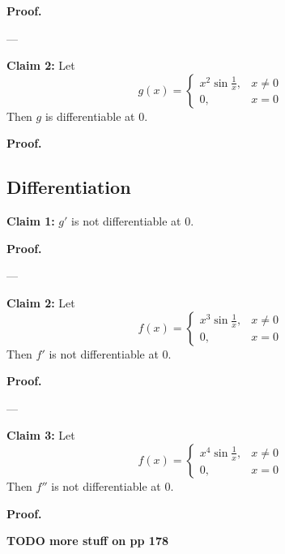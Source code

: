\vs

\textbf{Proof.}

\vs---\vs

\textbf{Claim 2:} Let
\[g(x)=\begin{cases}
  x^2\sin \frac{1}{x},&x\neq0\\
  0,&x=0
\end{cases}\]
Then $g$ is differentiable at $0$.

\vs

\textbf{Proof.}

\subsection{Differentiation}

\textbf{Claim 1:} $g'$ is not differentiable at $0$.

\textbf{Proof.}

\vs---\vs

\textbf{Claim 2:} Let
\[f(x)=\begin{cases}
  x^3\sin \frac{1}{x},&x\neq0\\
  0,&x=0
\end{cases}\]
Then $f'$ is not differentiable at $0$.

\vs

\textbf{Proof.}

\vs---\vs

\textbf{Claim 3:} Let
\[f(x)=\begin{cases}
  x^4\sin \frac{1}{x},&x\neq0\\
  0,&x=0
\end{cases}\]
Then $f''$ is not differentiable at $0$.

\vs

\textbf{Proof.}

\vs

\textbf{TODO more stuff on pp 178}

